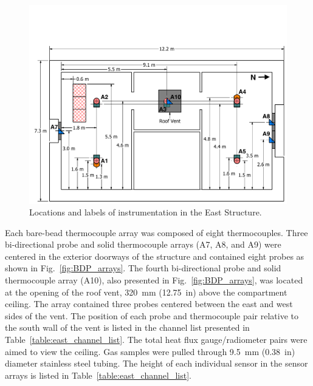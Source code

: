 \documentclass[12pt,oneside]{book}
\begin{document}
\begin{figure}[!ht]
	\includegraphics[width=\columnwidth]{../Figures/Floor_Plans/East_Structure_Dimensioned_Instrumentation}
	\caption{Locations and labels of instrumentation in the East Structure.}
	\label{fig:east_instrumentation}
\end{figure}
\FloatBarrier

Each bare-bead thermocouple array was composed of eight thermocouples. Three bi-directional probe and solid thermocouple arrays (A7, A8, and A9) were centered in the exterior doorways of the structure and contained eight probes as shown in Fig.~\ref{fig:BDP_arrays}. The fourth bi-directional probe and solid thermocouple array (A10), also presented in Fig.~\ref{fig:BDP_arrays}, was located at the opening of the roof vent, 320~mm (12.75~in) above the compartment ceiling. The array contained three probes centered between the east and west sides of the vent. The position of each probe and thermocouple pair relative to the south wall of the vent is listed in the channel list presented in Table~\ref{table:east_channel_list}. The total heat flux gauge/radiometer pairs were aimed to view the ceiling. Gas samples were pulled through 9.5~mm (0.38~in) diameter stainless steel tubing. The height of each individual sensor in the sensor arrays is listed in Table~\ref{table:east_channel_list}.   
\end{document}
